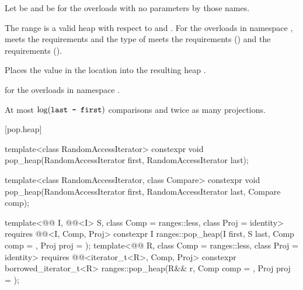 \begin{itemdescr}
\pnum
Let  be 
and  be 
for the overloads with no parameters by those names.

\pnum
\expects
The range 
is a valid heap with respect to  and .
For the overloads in namespace ,
 meets
the  requirements and
the type of  meets
the  requirements () and
the  requirements ().

\pnum
\effects
Places the value in the location 
into the resulting heap .

\pnum
\returns
{} for the overloads in namespace .

\pnum
\complexity
At most $\log(\tcode{last - first})$ comparisons and twice as many projections.
\end{itemdescr}

[pop.heap]{}

%
\begin{itemdecl}
template<class RandomAccessIterator>
  constexpr void pop_heap(RandomAccessIterator first, RandomAccessIterator last);

template<class RandomAccessIterator, class Compare>
  constexpr void pop_heap(RandomAccessIterator first, RandomAccessIterator last,
                          Compare comp);

template<@@ I, @@<I> S, class Comp = ranges::less,
         class Proj = identity>
  requires @@<I, Comp, Proj>
  constexpr I
    ranges::pop_heap(I first, S last, Comp comp = {}, Proj proj = {});
template<@@ R, class Comp = ranges::less, class Proj = identity>
  requires @@<iterator_t<R>, Comp, Proj>
  constexpr borrowed_iterator_t<R>
    ranges::pop_heap(R&& r, Comp comp = {}, Proj proj = {});
\end{itemdecl}

